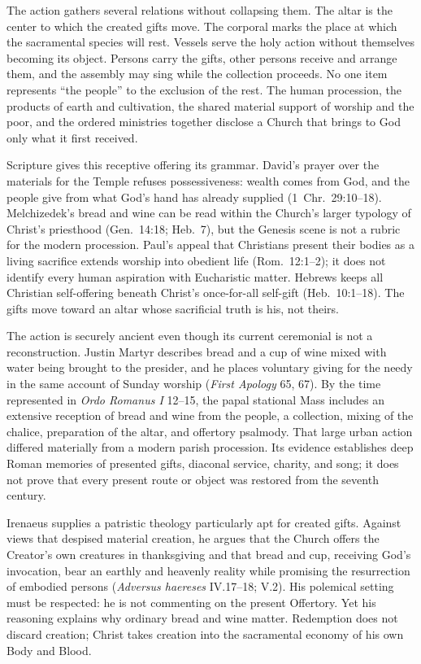 The action gathers several relations without collapsing them. The altar is the center to which the created gifts move. The corporal marks the place at which the sacramental species will rest. Vessels serve the holy action without themselves becoming its object. Persons carry the gifts, other persons receive and arrange them, and the assembly may sing while the collection proceeds. No one item represents ``the people'' to the exclusion of the rest. The human procession, the products of earth and cultivation, the shared material support of worship and the poor, and the ordered ministries together disclose a Church that brings to God only what it first received.

Scripture gives this receptive offering its grammar. David's prayer over the materials for the Temple refuses possessiveness: wealth comes from God, and the people give from what God's hand has already supplied (1~Chr.~29:10--18). Melchizedek's bread and wine can be read within the Church's larger typology of Christ's priesthood (Gen.~14:18; Heb.~7), but the Genesis scene is not a rubric for the modern procession. Paul's appeal that Christians present their bodies as a living sacrifice extends worship into obedient life (Rom.~12:1--2); it does not identify every human aspiration with Eucharistic matter. Hebrews keeps all Christian self-offering beneath Christ's once-for-all self-gift (Heb.~10:1--18). The gifts move toward an altar whose sacrificial truth is his, not theirs.

The action is securely ancient even though its current ceremonial is not a reconstruction. Justin Martyr describes bread and a cup of wine mixed with water being brought to the presider, and he places voluntary giving for the needy in the same account of Sunday worship (\emph{First Apology} 65, 67). By the time represented in \emph{Ordo Romanus I} 12--15, the papal stational Mass includes an extensive reception of bread and wine from the people, a collection, mixing of the chalice, preparation of the altar, and offertory psalmody. That large urban action differed materially from a modern parish procession. Its evidence establishes deep Roman memories of presented gifts, diaconal service, charity, and song; it does not prove that every present route or object was restored from the seventh century.

Irenaeus supplies a patristic theology particularly apt for created gifts. Against views that despised material creation, he argues that the Church offers the Creator's own creatures in thanksgiving and that bread and cup, receiving God's invocation, bear an earthly and heavenly reality while promising the resurrection of embodied persons (\emph{Adversus haereses} IV.17--18; V.2). His polemical setting must be respected: he is not commenting on the present Offertory. Yet his reasoning explains why ordinary bread and wine matter. Redemption does not discard creation; Christ takes creation into the sacramental economy of his own Body and Blood.

